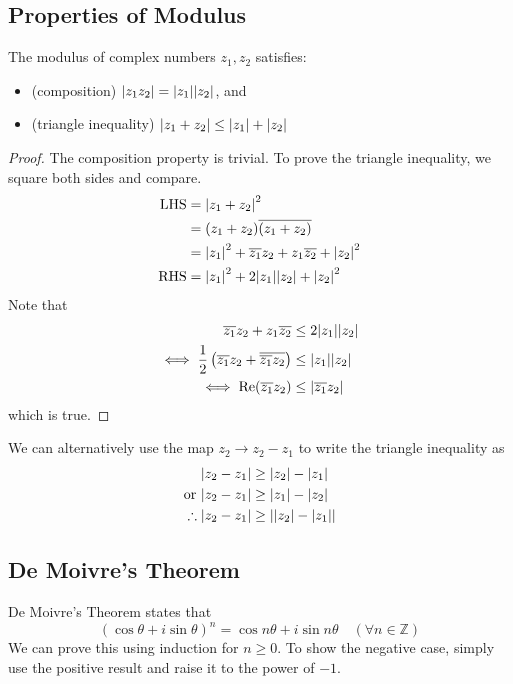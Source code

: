 \documentclass{article}
\begin{document}
	\subsection{Properties of Modulus}
	The modulus of complex numbers $z_1, z_2$ satisfies:
	\begin{itemize}
		\item (composition) $\abs{z_1 z_2} = \abs{z_1} \abs{z_2}$, and
		\item (triangle inequality) $\abs{z_1 + z_2} \leq \abs{z_1} + \abs{z_2}$
	\end{itemize}
	\begin{proof}
		The composition property is trivial. To prove the triangle inequality, we square both sides and compare.
		\begin{align*}
			\text{LHS} &= \abs{z_1 + z_2}^2 \\
			&= (z_1 + z_2)\overline{(z_1 + z_2)} \\
			&= \abs{z_1}^2 + \overline{z_1}z_2 + z_1\overline{z_2} + \abs{z_2}^2 \\
			\text{RHS} &= \abs{z_1}^2 + 2 \abs{z_1}\abs{z_2} + \abs{z_2}^2
		\end{align*}
		Note that
		\begin{align*}
			\overline{z_1}z_2 + z_1\overline{z_2} &\leq 2 \abs{z_1}\abs{z_2} \\
			\iff \frac{1}{2}\left( \overline{z_1}z_2 + \overline{\overline{z_1}z_2} \right) &\leq \abs{z_1}\abs{z_2} \\
			\iff \Re (\overline{z_1} z_2) &\leq \abs{\overline{z_1} z_2}
		\end{align*}
		which is true.
	\end{proof}

	We can alternatively use the map $z_2 \to z_2 - z_1$ to write the triangle inequality as
	\begin{align*}
		\abs{z_2 - z_1} &\geq \abs{z_2} - \abs{z_1} \\
		\text{or } \abs{z_2 - z_1} &\geq \abs{z_1} - \abs{z_2} \\
		\therefore \abs{z_2 - z_1} &\geq \abs{\abs{z_2} - \abs{z_1}} \\
	\end{align*}

	\subsection{De Moivre's Theorem}
	De Moivre's Theorem states that
	\[ (\cos \theta + i \sin \theta)^n = \cos n \theta + i \sin n \theta \quad(\forall n \in \mathbb Z) \]
	We can prove this using induction for $n \geq 0$. To show the negative case, simply use the positive result and raise it to the power of $-1$.
	
\end{document}
